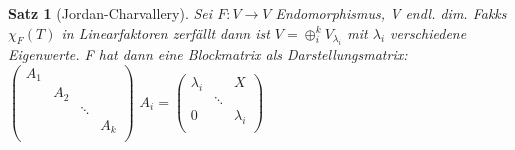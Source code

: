 \documentclass{report}
\newcommand{\lb}{\lambda}
\theoremstyle{customrem}
\theoremstyle{customdef}
\newtheorem{satz}[definition]{Satz}
\theoremstyle{customenv}
\begin{document}
\begin{satz}[Jordan-Charvallery]
  Sei \(F : V \to V\) Endomorphismus, V endl. dim. Fakks \(\chi_F(T)\) in
  Linearfaktoren zerf\"allt dann ist \(V = \oplus_{i}^k V_{\lb_i}\) mit \(\lb_i\)
  verschiedene Eigenwerte. F hat dann eine Blockmatrix als Darstellungsmatrix:\\
  \(
  \begin{pmatrix}
  A_1\\
      & A_2\\
      &       &\ddots\\
      &&&A_k\\
  \end{pmatrix}
  \)
  \(A_i = \begin{pmatrix}
    \lb_i&&X\\
    &\ddots&\\
    0&&\lb_i\\
  \end{pmatrix}\)
  

\end{satz}
\end{document}
